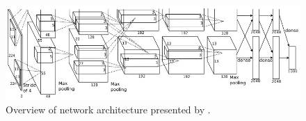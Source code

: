 \begin{figure}[htbp]
  \centering
  \includegraphics[width=\linewidth]{../images/architecture.jpg}
  \caption[]
  {\small
    Overview of network architecture presented by \cite{NIPS2012_4824}.
  }
  \label{fig:architecture}
\end{figure}
